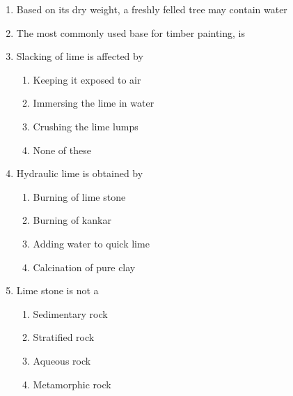 \documentclass[11pt,a4paper]{article}
\begin{document}
\begin{enumerate}
\item{Based on its dry weight, a freshly felled tree may contain water}
\\
\item{The most commonly used base for timber painting, is}
\\
\item{Slacking of lime is affected by}
\begin{enumerate}[label=\Alph*.]
\item{Keeping it exposed to air}
\item{Immersing the lime in water}
\item{Crushing the lime lumps}
\item{None of these}
\end{enumerate}
\item{Hydraulic lime is obtained by}
\begin{enumerate}[label=\Alph*.]
\item{Burning of lime stone}
\item{Burning of kankar}
\item{Adding water to quick lime}
\item{Calcination of pure clay}
\end{enumerate}
\item{Lime stone is not a}
\begin{enumerate}[label=\Alph*.]
\item{Sedimentary rock}
\item{Stratified rock}
\item{Aqueous rock}
\item{Metamorphic rock}
\end{enumerate}

\end{enumerate}
\end{document}

